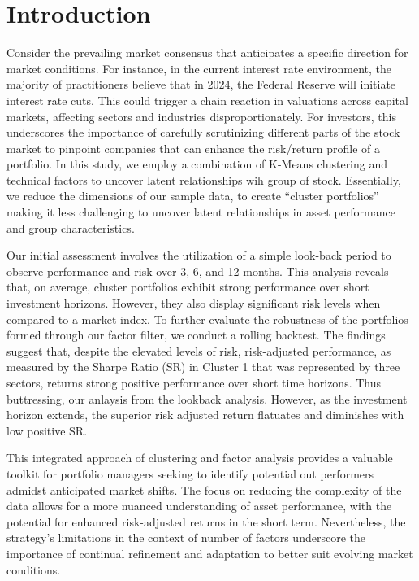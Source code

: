 \documentclass[11pt,preprint, authoryear]{elsarticle}
\numberwithin{equation}{section}
\numberwithin{figure}{section}
\numberwithin{table}{section}
\begin{document}
\headsep 35pt %




\hypertarget{introduction}{%
\section{Introduction}\label{introduction}}

Consider the prevailing market consensus that anticipates a specific
direction for market conditions. For instance, in the current interest
rate environment, the majority of practitioners believe that in 2024,
the Federal Reserve will initiate interest rate cuts. This could trigger
a chain reaction in valuations across capital markets, affecting sectors
and industries disproportionately. For investors, this underscores the
importance of carefully scrutinizing different parts of the stock market
to pinpoint companies that can enhance the risk/return profile of a
portfolio. In this study, we employ a combination of K-Means clustering
and technical factors to uncover latent relationships wih group of
stock. Essentially, we reduce the dimensions of our sample data, to
create ``cluster portfolios'' making it less challenging to uncover
latent relationships in asset performance and group characteristics.

Our initial assessment involves the utilization of a simple look-back
period to observe performance and risk over 3, 6, and 12 months. This
analysis reveals that, on average, cluster portfolios exhibit strong
performance over short investment horizons. However, they also display
significant risk levels when compared to a market index. To further
evaluate the robustness of the portfolios formed through our factor
filter, we conduct a rolling backtest. The findings suggest that,
despite the elevated levels of risk, risk-adjusted performance, as
measured by the Sharpe Ratio (SR) in Cluster 1 that was represented by
three sectors, returns strong positive performance over short time
horizons. Thus buttressing, our anlaysis from the lookback analysis.
However, as the investment horizon extends, the superior risk adjusted
return flatuates and diminishes with low positive SR.

This integrated approach of clustering and factor analysis provides a
valuable toolkit for portfolio managers seeking to identify potential
out performers admidst anticipated market shifts. The focus on reducing
the complexity of the data allows for a more nuanced understanding of
asset performance, with the potential for enhanced risk-adjusted returns
in the short term. Nevertheless, the strategy's limitations in the
context of number of factors underscore the importance of continual
refinement and adaptation to better suit evolving market conditions.
\end{document}
